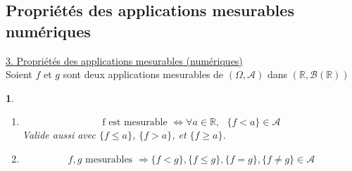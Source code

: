 \documentclass[8pt,notheorems]{beamer}
\def \R{\mathbb R}
\newtheorem{prop}{\translate{Proposition}}
\theoremstyle{definition}
\theoremstyle{example}
\theoremstyle{mystyle}
\theoremstyle{plain}
\begin{document}
\subsection{Propriétés des applications mesurables numériques}
\begin{frame}[allowframebreaks]
\underline{3. Propriétés des applications mesurables (numériques)}\\
Soient $f$ et $g$ sont deux applications mesurables de $(\Omega,\mathcal{A})$ dans $(\mathbb{R},\mathcal{B}(\mathbb{R}))$
\begin{prop}
\begin{enumerate}
\item $$
\text{f est mesurable }\Leftrightarrow \forall a\in \R,\text{ }\{f<a\}\in\mathcal{A}
$$
Valide aussi avec $\{f\leq a\}$, $\{f> a\}$, et $\{f\geq a\}$.
\item $$f,g\text{ mesurables }\Rightarrow \{f<g\},\{f\leq g\}, \{f=g\}, \{f\neq g\}\in\mathcal{A} $$


\end{enumerate}
\end{prop}
\end{frame}
\end{document}
